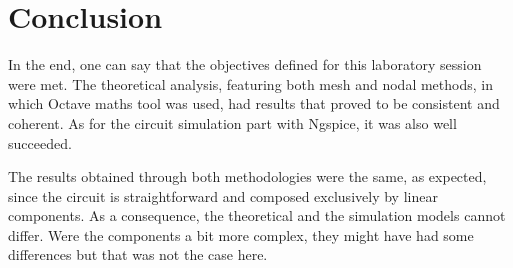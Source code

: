 \section{Conclusion}
\label{sec:conclusion}

\par
In the end, one can say that the objectives defined for this laboratory session were met. The theoretical analysis, featuring both mesh and nodal methods, in which Octave maths tool was used, had results that proved to be consistent and coherent. As for the circuit simulation part with Ngspice, it was also well succeeded.
\par
The results obtained through both methodologies were the same, as expected, since the circuit is straightforward and composed exclusively by linear components. As a consequence, the theoretical and the simulation models cannot differ. Were the components a bit more complex, they might have had some differences but that was not the case here.

